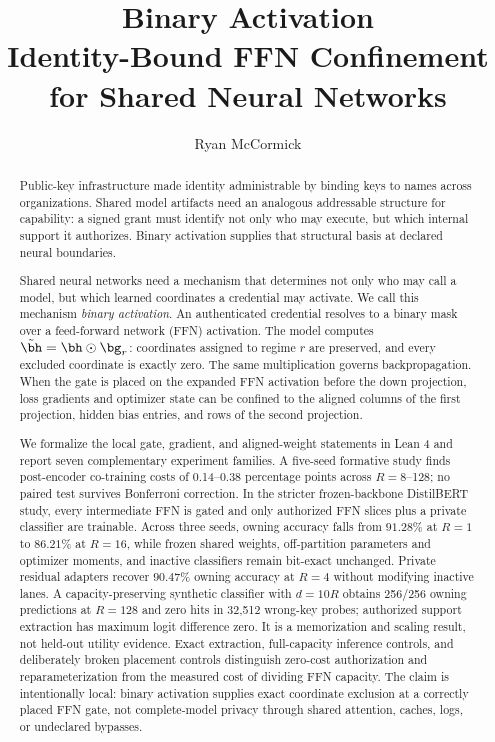 \documentclass[11pt]{article}
\title{\textbf{Binary Activation}\\
\large Identity-Bound FFN Confinement for Shared Neural Networks}
\author[1]{Ryan McCormick}
\affil[1]{Independent Researcher}
\begin{document}
\maketitle

\begin{abstract}
Public-key infrastructure made identity administrable by binding keys to names
across organizations. Shared model artifacts need an analogous addressable
structure for capability: a signed grant must identify not only who may execute,
but which internal support it authorizes. Binary activation supplies that
structural basis at declared neural boundaries.

Shared neural networks need a mechanism that determines not only who may call a
model, but which learned coordinates a credential may activate. We call this
mechanism \emph{binary activation}. An authenticated credential resolves to a
binary mask over a feed-forward network (FFN) activation. The model computes
$\tilde{\bh}=\bh\odot\bg_r$: coordinates assigned to regime $r$ are preserved,
and every excluded coordinate is exactly zero. The same multiplication governs
backpropagation. When the gate is placed on the expanded FFN activation before
the down projection, loss gradients and optimizer state can be confined to the
aligned columns of the first projection, hidden bias entries, and rows of the
second projection.

We formalize the local gate, gradient, and aligned-weight statements in Lean 4
and report seven complementary experiment families. A five-seed formative study
finds post-encoder co-training costs of 0.14--0.38 percentage points across
$R=8$--128; no paired test survives Bonferroni correction. In the stricter
frozen-backbone DistilBERT study, every intermediate
FFN is gated and only authorized FFN slices plus a private classifier are
trainable. Across three seeds, owning accuracy falls from $91.28\%$ at $R=1$ to
$86.21\%$ at $R=16$, while frozen shared weights, off-partition parameters and
optimizer moments, and inactive classifiers remain bit-exact unchanged. Private
residual adapters recover $90.47\%$ owning accuracy at $R=4$ without modifying
inactive lanes. A capacity-preserving synthetic classifier with $d=10R$ obtains
256/256 owning predictions at $R=128$ and zero hits in 32,512 wrong-key probes;
authorized support extraction has maximum logit difference zero. It is a
memorization and scaling result, not held-out utility evidence. Exact
extraction, full-capacity inference controls, and
deliberately broken placement controls distinguish zero-cost authorization and
reparameterization from the measured cost of dividing FFN capacity. The claim
is intentionally local: binary activation supplies exact coordinate exclusion
at a correctly placed FFN gate, not complete-model privacy through shared
attention, caches, logs, or undeclared bypasses.
\end{abstract}
\end{document}
